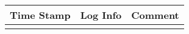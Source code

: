 \documentclass[journal, onecolumn, 12pt]{IEEEtran}
\begin{document}
	\begin{table}[h]
		\centering
		\begin{tabular}{|P{2cm}|P{2cm}|P{13cm}|}
			\hline
			\textbf{Time Stamp}         & \textbf{Log Info}           & \textbf{Comment}            \\ \hline
			 &  &  \\
			&                    &                    \\
			&                    &                    \\
			&                    &                    \\
			&                    &                    \\
			&                    &                    \\
			&                    &                    \\
			&                    &                    \\
			&                    &                    \\
			&                    &                    \\		
			&                    &                    \\
			&                    &                    \\
			&                    &                    \\
			&                    &                    \\
			&                    &                    \\	
			&                    &                    \\			
			&                    &                    \\
			&                    &                    \\
			&                    &                    \\
			&                    &                    \\		
			&                    &                    \\
			&                    &                    \\
			&                    &                    \\
			&                    &                    \\
			&                    &                    \\	
			&                    &                    \\

\end{tabular}
\end{table}
\end{document}
